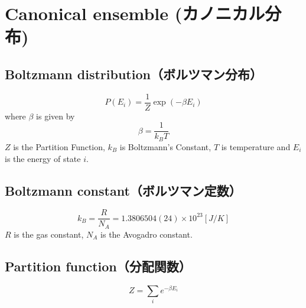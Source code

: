 %
%
%
%
%
\section{Canonical ensemble (カノニカル分布)}

\subsection{Boltzmann distribution（ボルツマン分布）}
\[ P \left( E_i \right) = \frac{1}{Z} \exp \left( -\beta E_i \right) \]
where $\beta $ is given by
\[ \beta = \frac{1}{k_B T} \]
$Z$ is the Partition Function, $k_B$ is Boltzmann's Constant, $T$ is temperature and $E_i$ is the energy of state $i$.

\subsection{Boltzmann constant（ボルツマン定数）}
\[ k_B = \frac{R}{N_A} = 1.3806504(24) \times 10^23   [J/K] \]
$R$ is the gas constant, $N_A$ is the Avogadro constant.

\subsection{Partition function（分配関数）}
\[ Z = \sum_i e^{-\beta E_i} \]

